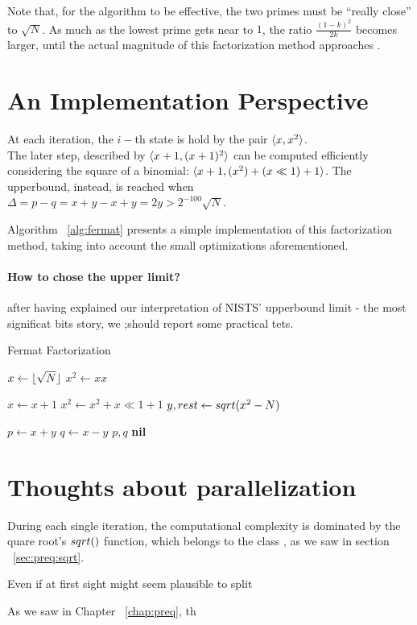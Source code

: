 \begin{remark}
  Note that, for the algorithm to be effective, the two primes must be
  ``really close'' to $\sqrt{N}$. As much as the lowest prime gets near to
  $1$, the ratio $\frac{(1-k)^2}{2k}$ becomes larger, until the actual magnitude
  of this factorization method approaches .
\end{remark}

\section{An Implementation Perspective}

At each iteration, the $i-$th state is hold by the pair $\langle x, x^2\rangle$.\\
The later step, described by $\langle x+1, (x+1)^2\rangle$ can be computed efficiently
considering the square of a binomial: $\langle x+1, (x^2) + (x \ll 1) + 1\rangle$.
The upperbound, instead, is reached when
$ \Delta = p - q  = x + y - x + y = 2y > 2^{-100}\sqrt{N}$.

Algorithm ~\ref{alg:fermat} presents a simple implementation of this
factorization method, taking into account the small optimizations
aforementioned.

\paragraph{How to chose the upper limit?}  after having explained our interpretation
of NISTS' upperbound limit - the most significat bits story, we ;should report
some practical tets.

\begin{algorithm}
  \caption{Fermat Factorization \label{alg:fermat}}
  \begin{algorithmic}[1]
    \State $x \gets \lfloor\sqrt{N}\rfloor$
    \State $x^2 \gets xx$

    \Repeat
    \State $x \gets x+1$
    \State $x^2 \gets x^2 + x \ll 1 + 1$
    \State $y, rest \gets sqrt(x^2 - N)$

    \State $p \gets x+y$
    \State $q \gets x-y$
    \State \Return $p, q$
    \Else
    \State \Return \textbf{nil}
    \EndIf
    \end{algorithmic}
\end{algorithm}


\section{Thoughts about parallelization}

During each single iteration, the computational complexity is dominated by the
quare root's $\dsqrt$ function, which belongs to the class
, as we saw in section ~\ref{sec:preq:sqrt}.

Even if at first sight might seem plausible to split

As we saw in Chapter ~\ref{chap:preq}, th
